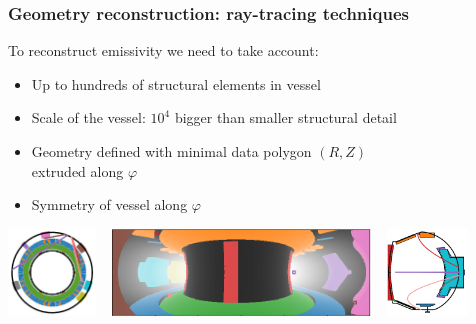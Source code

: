 \documentclass[10pt]{beamer}
\begin{document}
\begin{frame}
\frametitle{Geometry reconstruction: ray-tracing techniques}

	To reconstruct emissivity we need to take account:
	\begin{itemize}
	\item Up to hundreds of structural elements in vessel
	\item Scale of the vessel:
	$10^4$ bigger than smaller structural detail

	\item Geometry defined with minimal data polygon $(R,Z)$\\ extruded along $\varphi$
	\item Symmetry of vessel along $\varphi$
	
	\end{itemize}
	
	\vspace{0.5cm}
	\begin{center}
		\includegraphics[height=2.3cm]{figures/confB3_wp_view2.png}%
		~
		\includegraphics[height=2.3cm]{figures/confB3_wp_view1.png}%
		~
		\includegraphics[height=2.3cm]{figures/confB3_wp_view3.png}%
	\end{center}
	
\end{frame}
\end{document}
